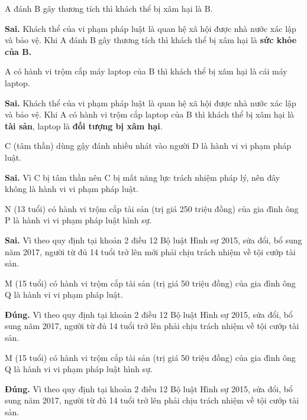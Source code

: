 \begin{ques}
A đánh B gây thương tích thì khách thể bị xâm hại là B.
\end{ques}
\begin{ans}
\textbf{Sai.} Khách thể của vi phạm pháp luật là quan hệ xã hội được nhà nước xác lập và bảo vệ. Khi A đánh B gây thương tích thì khách thể bị xâm hại là \textbf{sức khỏe của B.}
\end{ans}

\begin{ques}
A có hành vi trộm cắp máy laptop của B thì khách thể bị xâm hại là cái máy laptop.
\end{ques}
\begin{ans}
\textbf{Sai.} Khách thể của vi phạm pháp luật là quan hệ xã hội được nhà nước xác lập và bảo vệ. Khi A có hành vi trộm cắp laptop của B thì khách thể bị xâm hại là \textbf{tài sản}, laptop là \textbf{đối tượng bị xâm hại}.
\end{ans}

\begin{ques}
C (tâm thần) dùng gậy đánh nhiều nhát vào người D là hành vi vi phạm pháp luật.
\end{ques}
\begin{ans}
\textbf{Sai.} Vì C bị tâm thần nên C bị mất năng lực trách nhiệm pháp lý, nên đây không là hành vi vi phạm pháp luật.
\end{ans}

\begin{ques}
N (13 tuổi) có hành vi trộm cắp tài sản (trị giá 250 triệu đồng) của gia đình ông P là hành vi vi phạm pháp luật hình sự.
\end{ques}
\begin{ans}
\textbf{Sai.} Vì theo quy định tại khoản 2 điều 12 Bộ luật Hình sự 2015, sửa đổi, bổ sung năm 2017, người từ đủ 14 tuổi trở lên mới phải chịu trách nhiệm về tội cướp tài sản.
\end{ans}

\begin{ques}
M (15 tuổi) có hành vi trộm cắp tài sản (trị giá 50 triệu đồng) của gia đình ông Q là hành vi vi phạm pháp luật.
\end{ques}
\begin{ans}
\textbf{Đúng.} Vì theo quy định tại khoản 2 điều 12 Bộ luật Hình sự 2015, sửa đổi, bổ sung năm 2017, người từ đủ 14 tuổi trở lên phải chịu trách nhiệm về tội cướp tài sản.
\end{ans}

\begin{ques}
M (15 tuổi) có hành vi trộm cắp tài sản (trị giá 50 triệu đồng) của gia đình ông Q là hành vi vi phạm pháp luật hình sự.
\end{ques}
\begin{ans}
\textbf{Đúng.} Vì theo quy định tại khoản 2 điều 12 Bộ luật Hình sự 2015, sửa đổi, bổ sung năm 2017, người từ đủ 14 tuổi trở lên phải chịu trách nhiệm về tội cướp tài sản.
\end{ans}

